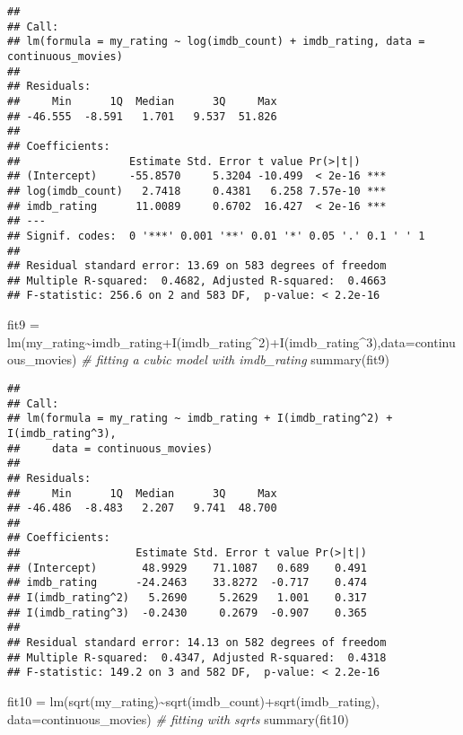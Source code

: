 \documentclass[
]{article}
\newenvironment{Shaded}{\begin{snugshade}}{\end{snugshade}}
\newcommand{\AttributeTok}[1]{\textcolor[rgb]{0.77,0.63,0.00}{#1}}
\newcommand{\CommentTok}[1]{\textcolor[rgb]{0.56,0.35,0.01}{\textit{#1}}}
\newcommand{\DecValTok}[1]{\textcolor[rgb]{0.00,0.00,0.81}{#1}}
\newcommand{\FunctionTok}[1]{\textcolor[rgb]{0.00,0.00,0.00}{#1}}
\newcommand{\NormalTok}[1]{#1}
\newcommand{\OtherTok}[1]{\textcolor[rgb]{0.56,0.35,0.01}{#1}}
\newcommand{\SpecialCharTok}[1]{\textcolor[rgb]{0.00,0.00,0.00}{#1}}
\begin{document}
\begin{verbatim}
## 
## Call:
## lm(formula = my_rating ~ log(imdb_count) + imdb_rating, data = continuous_movies)
## 
## Residuals:
##     Min      1Q  Median      3Q     Max 
## -46.555  -8.591   1.701   9.537  51.826 
## 
## Coefficients:
##                 Estimate Std. Error t value Pr(>|t|)    
## (Intercept)     -55.8570     5.3204 -10.499  < 2e-16 ***
## log(imdb_count)   2.7418     0.4381   6.258 7.57e-10 ***
## imdb_rating      11.0089     0.6702  16.427  < 2e-16 ***
## ---
## Signif. codes:  0 '***' 0.001 '**' 0.01 '*' 0.05 '.' 0.1 ' ' 1
## 
## Residual standard error: 13.69 on 583 degrees of freedom
## Multiple R-squared:  0.4682, Adjusted R-squared:  0.4663 
## F-statistic: 256.6 on 2 and 583 DF,  p-value: < 2.2e-16
\end{verbatim}

\begin{Shaded}
\begin{Highlighting}[]
\NormalTok{fit9 }\OtherTok{=} \FunctionTok{lm}\NormalTok{(my\_rating}\SpecialCharTok{\textasciitilde{}}\NormalTok{imdb\_rating}\SpecialCharTok{+}\FunctionTok{I}\NormalTok{(imdb\_rating}\SpecialCharTok{\^{}}\DecValTok{2}\NormalTok{)}\SpecialCharTok{+}\FunctionTok{I}\NormalTok{(imdb\_rating}\SpecialCharTok{\^{}}\DecValTok{3}\NormalTok{),}\AttributeTok{data=}\NormalTok{continuous\_movies) }\CommentTok{\# fitting a cubic model with imdb\_rating}
\FunctionTok{summary}\NormalTok{(fit9)}
\end{Highlighting}
\end{Shaded}

\begin{verbatim}
## 
## Call:
## lm(formula = my_rating ~ imdb_rating + I(imdb_rating^2) + I(imdb_rating^3), 
##     data = continuous_movies)
## 
## Residuals:
##     Min      1Q  Median      3Q     Max 
## -46.486  -8.483   2.207   9.741  48.700 
## 
## Coefficients:
##                  Estimate Std. Error t value Pr(>|t|)
## (Intercept)       48.9929    71.1087   0.689    0.491
## imdb_rating      -24.2463    33.8272  -0.717    0.474
## I(imdb_rating^2)   5.2690     5.2629   1.001    0.317
## I(imdb_rating^3)  -0.2430     0.2679  -0.907    0.365
## 
## Residual standard error: 14.13 on 582 degrees of freedom
## Multiple R-squared:  0.4347, Adjusted R-squared:  0.4318 
## F-statistic: 149.2 on 3 and 582 DF,  p-value: < 2.2e-16
\end{verbatim}

\begin{Shaded}
\begin{Highlighting}[]
\NormalTok{fit10 }\OtherTok{=} \FunctionTok{lm}\NormalTok{(}\FunctionTok{sqrt}\NormalTok{(my\_rating)}\SpecialCharTok{\textasciitilde{}}\FunctionTok{sqrt}\NormalTok{(imdb\_count)}\SpecialCharTok{+}\FunctionTok{sqrt}\NormalTok{(imdb\_rating), }\AttributeTok{data=}\NormalTok{continuous\_movies) }\CommentTok{\# fitting with sqrts}
\FunctionTok{summary}\NormalTok{(fit10)}
\end{Highlighting}
\end{Shaded}
\end{document}
